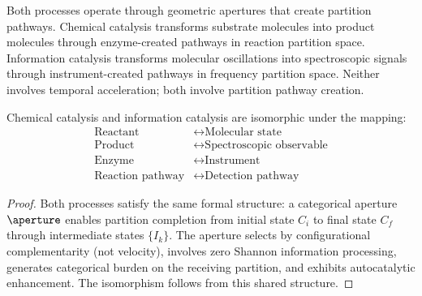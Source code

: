 Both processes operate through geometric apertures that create partition pathways. Chemical catalysis transforms substrate molecules into product molecules through enzyme-created pathways in reaction partition space. Information catalysis transforms molecular oscillations into spectroscopic signals through instrument-created pathways in frequency partition space. Neither involves temporal acceleration; both involve partition pathway creation.

\begin{theorem}
\label{thm:catalysis_iso}
Chemical catalysis and information catalysis are isomorphic under the mapping:
\begin{align}
\text{Reactant} &\leftrightarrow \text{Molecular state} \\
\text{Product} &\leftrightarrow \text{Spectroscopic observable} \\
\text{Enzyme} &\leftrightarrow \text{Instrument} \\
\text{Reaction pathway} &\leftrightarrow \text{Detection pathway}
\end{align}
\end{theorem}

\begin{proof}
Both processes satisfy the same formal structure: a categorical aperture $\aperture$ enables partition completion from initial state $C_i$ to final state $C_f$ through intermediate states $\{I_k\}$. The aperture selects by configurational complementarity (not velocity), involves zero Shannon information processing, generates categorical burden on the receiving partition, and exhibits autocatalytic enhancement. The isomorphism follows from this shared structure.
\end{proof}

